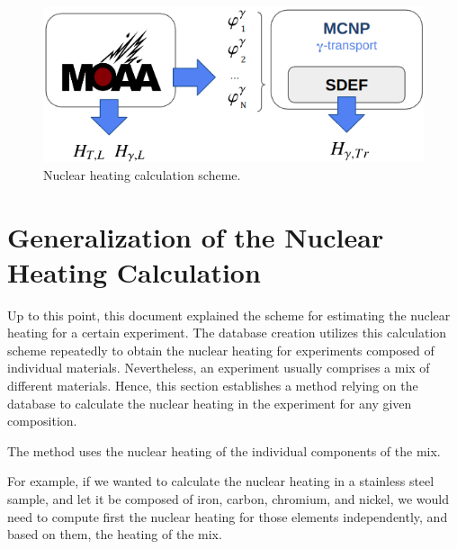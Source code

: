 \begin{figure}[htbp!] %
  \centering
  \includegraphics[width=0.8\linewidth]{figures/heat-flow}
  \caption{Nuclear heating calculation scheme.}
  \label{fig:heat-flow}
\end{figure}


\section{Generalization of the Nuclear Heating Calculation}
\label{sec:3-gen}

% 

Up to this point, this document explained the scheme for estimating the nuclear heating for a certain experiment.
The database creation utilizes this calculation scheme repeatedly to obtain the nuclear heating for experiments composed of individual materials.
Nevertheless, an experiment usually comprises a mix of different materials.
Hence, this section establishes a method relying on the database to calculate the nuclear heating in the experiment for any given composition.

The method uses the nuclear heating of the individual components of the mix.

For example, if we wanted to calculate the nuclear heating in a stainless steel sample, and let it be composed of iron, carbon, chromium, and nickel, we would need to compute first the nuclear heating for those elements independently, and based on them, the heating of the mix.

